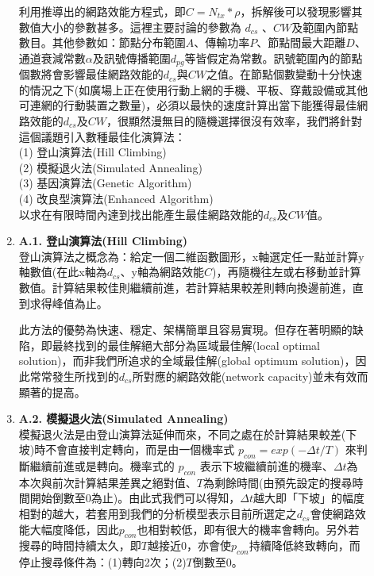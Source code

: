 \documentclass[12pt,a4paper]{article}
\begin{document}
\begin{description}
\begin{enumerate}
利用推導出的網路效能方程式，即$C = N_{tx}*\rho$，拆解後可以發現影響其數值大小的參數甚多。這裡主要討論的參數為 $d_{cs}$ 、$CW$及範圍內節點數目。其他參數如：節點分布範圍$A$、傳輸功率$P$、節點間最大距離$D$、通道衰減常數$\alpha$及訊號傳播範圍$d_{pg}$等皆假定為常數。訊號範圍內的節點個數將會影響最佳網路效能的$d_{cs}$與$CW$之值。在節點個數變動十分快速的情況之下(如廣場上正在使用行動上網的手機、平板、穿戴設備或其他可連網的行動裝置之數量)，必須以最快的速度計算出當下能獲得最佳網路效能的$d_{cs}$及$CW$，很顯然漫無目的隨機選擇很沒有效率，我們將針對這個議題引入數種最佳化演算法：\\
(1) 登山演算法(Hill Climbing)\\
(2) 模擬退火法(Simulated Annealing) \\
(3) 基因演算法(Genetic Algorithm) \\
(4) 改良型演算法(Enhanced Algorithm)\\
以求在有限時間內達到找出能產生最佳網路效能的$d_{cs}$及$CW$值。\\

\item [\bf ]{\textbf{\Kai A.1. 登山演算法(Hill Climbing) }}\\

登山演算法之概念為：給定一個二維函數圖形，x軸選定任一點並計算y軸數值(在此x軸為$d_{cs}$、y軸為網路效能$C$)，再隨機往左或右移動並計算數值。計算結果較佳則繼續前進，若計算結果較差則轉向換邊前進，直到求得峰值為止。

此方法的優勢為快速、穩定、架構簡單且容易實現。但存在著明顯的缺陷，即最終找到的最佳解絕大部分為區域最佳解(local optimal solution)，而非我們所追求的全域最佳解(global optimum solution)，因此常常發生所找到的$d_{cs}$所對應的網路效能(network capacity)並未有效而顯著的提高。\\


\item [\bf ]{\textbf{\Kai A.2. 模擬退火法(Simulated Annealing)  }}\\

模擬退火法是由登山演算法延伸而來，不同之處在於計算結果較差(下坡)時不會直接判定轉向，而是由一個機率式 $p_{con} = exp (- \Delta t / T)$ 來判斷繼續前進或是轉向。機率式的 $p_{con}$ 表示下坡繼續前進的機率、$\Delta t$為本次與前次計算結果差異之絕對值、$T$為剩餘時間(由預先設定的搜尋時間開始倒數至0為止)。由此式我們可以得知，$\Delta t$越大即「下坡」的幅度相對的越大，若套用到我們的分析模型表示目前所選定之$d_{cs}$會使網路效能大幅度降低，因此$p_{con}$也相對較低，即有很大的機率會轉向。另外若搜尋的時間持續太久，即$T$越接近0，亦會使$p_{con}$持續降低終致轉向，而停止搜尋條件為：(1)轉向2次；(2)$T$倒數至0。


\end{enumerate}
\end{description}
\end{document}
